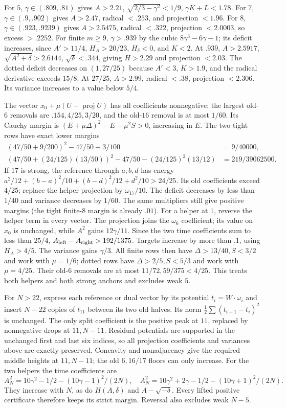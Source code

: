 \documentclass[11pt]{article}
\theoremstyle{remark}
\begin{document}
For $5$, $\gamma\in(.809,.81)$ gives $A>2.21$,
$\sqrt{2/3-\gamma^2}<1/9$, $\gamma K+L<1.78$.
For $7$, $\gamma\in(.9,.902)$ gives $A>2.47$, radical $<.253$,
and projection $<1.96$.
For $8$, $\gamma\in(.923,.9239)$ gives $A>2.5475$, radical
$<.322$, projection $<2.0003$, so excess $>.2252$.
For finite $m\ge9$, $\gamma>.939$ by the cubic
$8\gamma^3-6\gamma-1$; its deficit increases, since
$A'>11/4$, $H_A>20/23$, $H_\delta<0$, and $K<2$.
At $.939$, $A>2.5917$, $\sqrt{A^2+\delta}>2.6144$,
$\sqrt\delta<.344$, giving $H>2.29$ and projection $<2.03$.
The dotted deficit decreases on $(1,27/25)$ because
$A'<3$, $K>1.9$, and the radical derivative exceeds $15/8$.
At $27/25$, $A>2.99$, radical $<.38$, projection $<2.306$.
Its variance increases to a value below $5/4$.

The vector $x_0+\mu(U-\operatorname{proj}U)$ has all coefficients
nonnegative: the largest old-$6$ removals are $.154,4/25,3/20$,
and the old-$16$ removal is at most $1/60$.
Its Cauchy margin is
$(E+\mu\Delta)^2-E-\mu^2S>0$, increasing in $E$.
The two tight rows have exact lower margins
\[
\begin{aligned}
 (47/50+9/200)^2-47/50-3/100&=9/40000,\\
 (47/50+(24/125)(13/50))^2-47/50-(24/125)^2(13/12)
 &=219/39062500.
\end{aligned}
\]
If $17$ is strong, the reference through $a,b,d$ has energy
$a^2/12+(b-a)^2/10+(b-d)^2/12+d^2/10>24/25$.
Its old coefficients exceed $4/25$; replace the helper projection
by $\omega_{17}/10$. The deficit decreases by less than $1/40$
and variance decreases by $1/60$. The same multipliers still give
positive margins (the tight finite-$8$ margin is already $.01$).
For a helper at $1$, reverse the helper term in every vector.
The projection joins the $\omega_6$ coefficient; its value on $x_0$
is unchanged, while $A^2$ gains $12\gamma/11$.
Since the two time coefficients sum to less than $25/4$,
$A_{\rm left}-A_{\rm right}>192/1375$.
Targets increase by more than $.1$, using $H_A>4/5$.
The variance gains $\gamma/3$. All finite rows then have
$\Delta>13/40,S<3/2$ and work with $\mu=1/6$;
dotted rows have $\Delta>2/5,S<5/3$ and work with $\mu=4/25$.
Their old-$6$ removals are at most $11/72,59/375<4/25$.
This treats both helpers and both strong anchors and excludes weak $5$.

For $N>22$, express each reference or dual vector by its potential
$t_i=W\cdot\omega_i$ and insert $N-22$ copies of $t_{11}$
between its two old halves. Its norm
$\frac12\sum(t_{i+1}-t_i)^2$ is unchanged.
The only split coefficient is the positive peak at $11$, replaced
by nonnegative drops at $11,N-11$. Residual potentials are supported
in the unchanged first and last six indices, so all projection
coefficients and variances above are exactly preserved.
Concavity and nonadjacency give the required middle heights at
$11,N-11$; the old $6,16/17$ floors can only increase.
For the two helpers the time coefficients are
\[
 A_N^2=10\gamma^2-1/2-(10\gamma-1)^2/(2N),\quad
 A_N^2=10\gamma^2+2\gamma-1/2-(10\gamma+1)^2/(2N).
\]
They increase with $N$, as do $H(A,\delta)$ and $A-\sqrt{-\delta}$.
Every lifted positive certificate therefore keeps its strict margin.
Reversal also excludes weak $N-5$.
\end{document}
